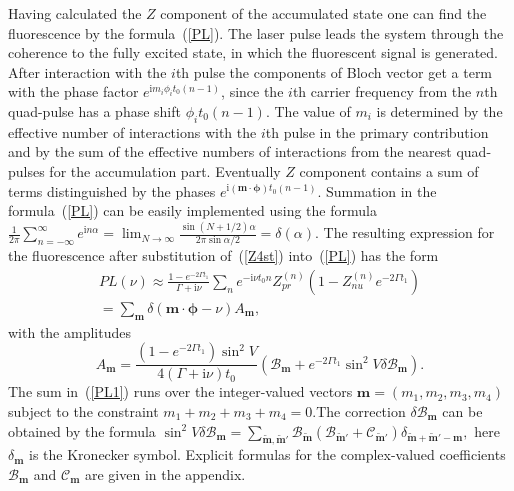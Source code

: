 \documentclass[prb,twocolumn,showpacs,epsfig,epsf]{revtex4}
\renewcommand{\i}{\mathrm{i}}
\newcommand{\1}{\mathds{1}}
\begin{document}
Having calculated the $Z$ component of the accumulated state one can find the fluorescence by the formula~(\ref{PL}). The laser pulse leads the system through the coherence to the fully excited state, in which the fluorescent signal is generated. After interaction with the $i$th pulse the components of Bloch vector get a term with the phase factor $e^{\i m_i\phi_it_0(n-1)}$, since the $i$th carrier frequency from the $n$th quad-pulse has a phase shift $\phi_it_0(n-1)$. The value of $m_i$ is determined by the effective number of interactions with the $i$th pulse in the primary contribution and by the sum of the effective numbers of interactions from the nearest quad-pulses for the accumulation part. Eventually $Z$ component contains a sum of terms distinguished by the phases  $e^{\i (\boldsymbol m\cdot \boldsymbol \phi) t_0(n-1)}$. Summation in the formula~(\ref{PL}) can be easily implemented using the formula $\frac{1}{2\pi}\sum_{n=-\infty}^\infty e^{\i n \alpha}=\lim_{N\to\infty}\frac{\sin(N+1/2)\alpha}{2\pi\sin \alpha/2}=\delta(\alpha)$. The resulting expression for the fluorescence after substitution of~(\ref{Z4st}) into~(\ref{PL}) has the form
\begin{multline}\label{PL1}
PL(\nu)\approx\frac{1- e^{-2\Gamma t_1}}{\Gamma+\i\nu}\sum_n e^{-\i\nu t_0 n}Z_{pr}^{(n)} \left(1-Z_{nu}^{(n)} e^{-2\Gamma t_1}\right)\\ =\sum_{\boldsymbol m}\delta(\boldsymbol m\cdot\boldsymbol \phi-\nu) A_{\boldsymbol m}, 
\end{multline}
with the amplitudes
\begin{equation}
A_{\boldsymbol m}=\frac{(1- e^{-2\Gamma t_1})\sin^2V}{4(\Gamma+\i\nu)t_0}\left( \mathcal{B}_{\boldsymbol m}+e^{-2\Gamma t_1}\sin^2V\delta \mathcal{B}_{\boldsymbol m}\right).
\end{equation}
The sum in~(\ref{PL1}) runs over the integer-valued vectors $\bm m=(m_1,m_2,m_3,m_4) $ subject to the constraint $m_1+m_2+m_3+m_4=0$.The correction $\delta\mathcal{B}_{\boldsymbol m}$ can be obtained by the formula
$
\sin^2V\delta\mathcal{B}_{\boldsymbol m}=\sum_{\tilde{\boldsymbol m},\tilde{\boldsymbol m}'}\mathcal{B}_{\tilde{\boldsymbol m}}\left(\mathcal{B}_{\tilde{\boldsymbol m}'}+\mathcal{C} _{\tilde{\boldsymbol m}'}\right)\delta_{\tilde{\boldsymbol m} +\tilde{\boldsymbol m}'-\boldsymbol m},
$ here $\delta_{\boldsymbol m}$ is the Kronecker symbol. Explicit formulas for the complex-valued coefficients $\mathcal{B}_{\boldsymbol m}$ and $\mathcal{C} _{\boldsymbol m}$ are given in the appendix. 
\end{document}
